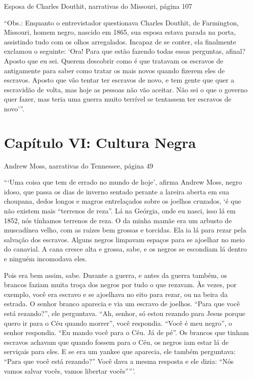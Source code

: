 Esposa de Charles Douthit, narrativas do Missouri, página 107

``Obs.: Enquanto o entrevistador questionava Charles Douthit, de
Farmington, Missouri, homem negro, nascido em 1865, sua esposa estava
parada na porta, assistindo tudo com os olhos arregalados. Incapaz de se
conter, ela finalmente exclamou o seguinte: `Ora! Para que estão fazendo
todas essas perguntas, afinal? Aposto que eu sei. Querem descobrir como
é que tratavam os escravos de antigamente para saber como tratar os mais
novos quando fizerem eles de escravos. Aposto que vão tentar ter
escravos de novo, e tem gente que quer a escravidão de volta, mas hoje
as pessoas não vão aceitar. Não sei o que o governo quer fazer, mas
teria uma guerra muito terrível se tentassem ter escravos de novo'''.

\chapter{Capítulo VI: Cultura Negra}

Andrew Moss, narrativas do Tennessee, página 49

```Uma coisa que tem de errado no mundo de hoje', afirma Andrew Moss,
negro idoso, que passa os dias de inverno sentado perante a lareira
aberta em sua choupana, dedos longos e magros entrelaçados sobre os
joelhos cruzados, `é que não existem mais ``terrenos de reza''. Lá na
Geórgia, onde eu nasci, isso lá em 1852, nós tínhamos terrenos de reza.
O da minha mamãe era um arbusto de muscadínea velho, com as raízes bem
grossas e torcidas. Ela ia lá para rezar pela salvação dos escravos.
Alguns negros limpavam espaços para se ajoelhar no meio do canavial. A
cana cresce alta e grossa, sabe, e os negros se escondiam lá dentro e
ninguém incomodava eles.

Pois era bem assim, sabe. Durante a guerra, e antes da guerra também, os
brancos faziam muita troça dos negros por tudo o que rezavam. Às vezes,
por exemplo, você era escravo e se ajoelhava no eito para rezar, ou na
beira da estrada. O senhor branco aparecia e via um escravo de joelhos.
``Para que você está rezando?'', ele perguntava. ``Ah, senhor, só estou
rezando para Jesus porque quero ir para o Céu quando morrer'', você
respondia. ``Você é meu negro'', o senhor respondia. ``Eu mando você
para o Céu. Já de pé''. Os brancos que tinham escravos achavam que
quando fossem para o Céu, os negros iam estar lá de serviçais para eles.
E se era um yankee que aparecia, ele também perguntava: ``Para que você
está rezando?'' Você dava a mesma resposta e ele dizia: ``Nós vamos
salvar vocês, vamos libertar vocês'''''.

